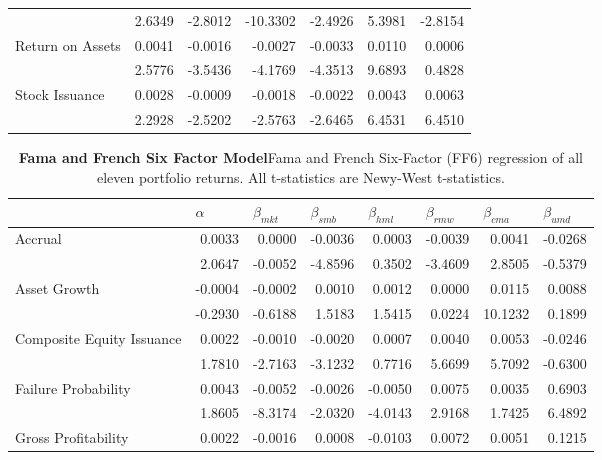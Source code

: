 \begin{table}[htbp]
\begin{tabular}{@{}lrrrrrr@{}}
& 2.6349 & -2.8012 & -10.3302 & -2.4926 & 5.3981 & -2.8154 \\
\multirow{2}{*}{Return on Assets} & 0.0041 & -0.0016 & -0.0027 & -0.0033 & 0.0110 & 0.0006 \\
& 2.5776 & -3.5436 & -4.1769 & -4.3513 & 9.6893 & 0.4828 \\
\multirow{2}{*}{Stock Issuance} & 0.0028 & -0.0009 & -0.0018 & -0.0022 & 0.0043 & 0.0063 \\
& 2.2928 & -2.5202 & -2.5763 & -2.6465 & 6.4531 & 6.4510 \\ \bottomrule
\end{tabular}%
\end{table}

\begin{sidewaystable}[htbp]
\centering
\scriptsize
\caption[Fama and French Six Factor Model]{\textbf{Fama and French Six Factor Model}\newline Fama and French Six-Factor (FF6) regression of all eleven portfolio returns. All t-statistics are Newy-West t-statistics.}
\label{tab:ff6}
\begin{tabular}{@{}lrrrrrrr@{}}
\toprule
& \multicolumn{1}{l}{$\alpha$} & \multicolumn{1}{l}{$\beta_{mkt}$} & \multicolumn{1}{l}{$\beta_{smb}$} & \multicolumn{1}{l}{$\beta_{hml}$} & \multicolumn{1}{l}{$\beta_{rmw}$} & \multicolumn{1}{l}{$\beta_{cma}$} & \multicolumn{1}{l}{$\beta_{umd}$} \\ \midrule
\multirow{2}{*}{Accrual} & 0.0033 & 0.0000 & -0.0036 & 0.0003 & -0.0039 & 0.0041 & -0.0268 \\
& 2.0647 & -0.0052 & -4.8596 & 0.3502 & -3.4609 & 2.8505 & -0.5379 \\
\multirow{2}{*}{Asset Growth} & -0.0004 & -0.0002 & 0.0010 & 0.0012 & 0.0000 & 0.0115 & 0.0088 \\
& -0.2930 & -0.6188 & 1.5183 & 1.5415 & 0.0224 & 10.1232 & 0.1899 \\
\multirow{2}{*}{Composite Equity Issuance} & 0.0022 & -0.0010 & -0.0020 & 0.0007 & 0.0040 & 0.0053 & -0.0246 \\
& 1.7810 & -2.7163 & -3.1232 & 0.7716 & 5.6699 & 5.7092 & -0.6300 \\
\multirow{2}{*}{Failure Probability} & 0.0043 & -0.0052 & -0.0026 & -0.0050 & 0.0075 & 0.0035 & 0.6903 \\
& 1.8605 & -8.3174 & -2.0320 & -4.0143 & 2.9168 & 1.7425 & 6.4892 \\
\multirow{2}{*}{Gross Profitability} & 0.0022 & -0.0016 & 0.0008 & -0.0103 & 0.0072 & 0.0051 & 0.1215 \\

\end{tabular}
\end{sidewaystable}
